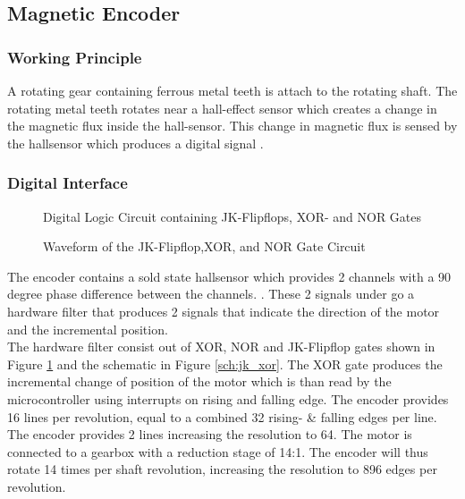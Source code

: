 \subsection{Magnetic Encoder}
\subsubsection{Working Principle}
A rotating gear containing ferrous metal teeth is attach to the rotating shaft. The rotating metal teeth rotates near a hall-effect sensor which creates a change in the magnetic flux inside the hall-sensor. This change in magnetic flux is sensed by the hallsensor which produces a digital signal \citep{hallsensor}.
\subsubsection{Digital Interface} 

\begin{figure}[h]
	\centering
	
	\caption{Digital Logic Circuit containing JK-Flipflops, XOR- and NOR Gates}
	\label{fig:jk_xor}
\end{figure}

\begin{figure}[h]
	\centering
	
	\caption{Waveform of the JK-Flipflop,XOR, and NOR Gate Circuit}
	\label{fig:jk_xor_waveform}
\end{figure}

The encoder contains a sold state hallsensor which provides 2 channels with a 90 degree phase difference between the channels. \citep{faulhaberencoder}. These 2 signals under go a hardware filter that produces 2 signals that indicate the direction of the motor and the incremental position.\\

The hardware filter consist out of XOR, NOR and JK-Flipflop gates shown in Figure \ref{fig:jk_xor} and the schematic in Figure \ref{sch:jk_xor}. The XOR gate produces the incremental change of position of the motor which is than read by the microcontroller using interrupts on rising and falling edge. The encoder provides 16 lines per revolution, equal to a combined 32 rising- \& falling edges per line. The encoder provides 2 lines increasing the resolution to 64. The motor is connected to a gearbox with a reduction stage of 14:1. The encoder will thus rotate 14 times per shaft revolution, increasing the resolution to 896 edges per revolution.\\

